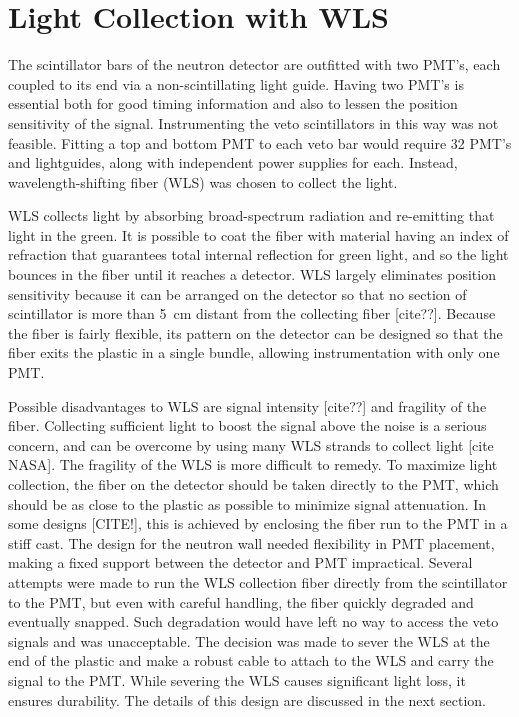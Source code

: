 \section{Light Collection with WLS}

The scintillator bars of the neutron detector are outfitted with two PMT's, each coupled to its end via a non-scintillating light guide.  Having two PMT's is essential both for good timing information and also to lessen the position sensitivity of the signal.  Instrumenting the veto scintillators in this way was not feasible.  Fitting a top and bottom PMT to each veto bar would require 32 PMT's and lightguides, along with independent power supplies for each.  Instead, wavelength-shifting fiber (WLS) was chosen to collect the light.

WLS collects light by absorbing broad-spectrum radiation and re-emitting that light in the green.  It is possible to coat the fiber with material having an index of refraction that guarantees total internal reflection for green light, and so the light bounces in the fiber until it reaches a detector.  WLS largely eliminates position sensitivity because it can be arranged on the detector so that no section of scintillator is more than 5~cm distant from the collecting fiber [cite??].  Because the fiber is fairly flexible, its pattern on the detector can be designed so that the fiber exits the plastic in a single bundle, allowing instrumentation with only one PMT.

Possible disadvantages to WLS are signal intensity [cite??] and fragility of the fiber.  Collecting sufficient light to boost the signal above the noise is a serious concern, and can be overcome by using many WLS strands to collect light [cite NASA].  The fragility of the WLS is more difficult to remedy.  To maximize light collection, the fiber on the detector should be taken directly to the PMT, which should be as close to the plastic as possible to minimize signal attenuation.  In some designs [CITE!], this is achieved by enclosing the fiber run to the PMT in a stiff cast.  The design for the neutron wall needed flexibility in PMT placement, making a fixed support between the detector and PMT impractical.  Several attempts were made to run the WLS collection fiber directly from the scintillator to the PMT, but even with careful handling, the fiber quickly degraded and eventually snapped.  Such degradation would have left no way to access the veto signals and was unacceptable.  The decision was made to sever the WLS at the end of the plastic and make a robust cable to attach to the WLS and carry the signal to the PMT.  While severing the WLS causes significant light loss, it ensures durability.  The details of this design are discussed in the next section.  

